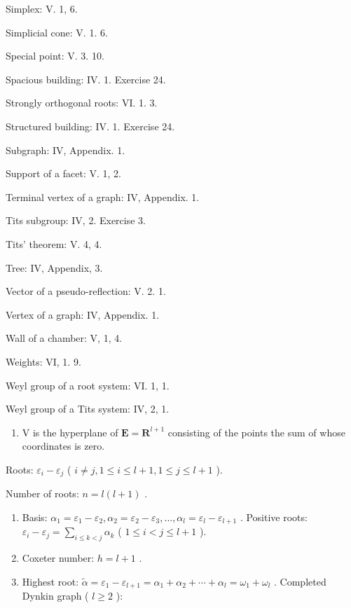 Simplex: V. 1, 6.

Simplicial cone: V. 1. 6.

Special point: V. 3. 10.

Spacious building: IV. 1. Exercise 24.

Strongly orthogonal roots: VI. 1. 3.

Structured building: IV. 1. Exercise 24.

Subgraph: IV, Appendix. 1.

Support of a facet: V. 1, 2.

Terminal vertex of a graph: IV, Appendix. 1.

Tits subgroup: IV, 2. Exercise 3.

Tits' theorem: V. 4, 4.

Tree: IV, Appendix, 3.

Vector of a pseudo-reflection: V. 2. 1.

Vertex of a graph: IV, Appendix. 1.

Wall of a chamber: V, 1, 4.

Weights: VI, 1. 9.

Weyl group of a root system: VI. 1, 1.

Weyl group of a Tits system: IV, 2, 1.


\begin{enumerate}
\def\labelenumi{(\Roman{enumi})}
\tightlist
\item
  V is the hyperplane of \(\mathbf{E} = \mathbf{R}^{l + 1}\) consisting of the points the sum of whose coordinates is zero.
\end{enumerate}

Roots: \(\varepsilon_{i} - \varepsilon_{j}\) ( \(i \neq j, 1 \leqslant i \leqslant l + 1, 1 \leqslant j \leqslant l + 1\) ).

Number of roots: \(n = l(l + 1)\) .

\begin{enumerate}
\def\labelenumi{(\Roman{enumi})}
\setcounter{enumi}{1}
\item
  Basis: \(\alpha_{1} = \varepsilon_{1} - \varepsilon_{2},\alpha_{2} = \varepsilon_{2} - \varepsilon_{3},\ldots ,\alpha_{l} = \varepsilon_{l} - \varepsilon_{l + 1}\) . Positive roots: \(\varepsilon_{i} - \varepsilon_{j} = \sum_{i\leqslant k <   j}\alpha_{k}\) ( \(1\leqslant i <   j\leqslant l + 1\) ).
\item
  Coxeter number: \(h = l + 1\) .
\item
  Highest root: \(\tilde{\alpha} = \varepsilon_{1} - \varepsilon_{l+1} = \alpha_{1} + \alpha_{2} + \cdots + \alpha_{l} = \omega_{1} + \omega_{l}\) . Completed Dynkin graph ( \(l \geqslant 2\) ):
\end{enumerate}

